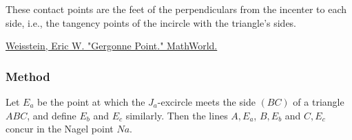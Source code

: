\medskip

These contact points are the feet of the perpendiculars from the incenter to each side, i.e., the tangency points of the incircle with the triangle’s sides.
\begin{flushright}
\small
\href{https://mathworld.wolfram.com/GergonnePoint.html}{Weisstein, Eric W. "Gergonne Point." MathWorld.}
\end{flushright}

\vspace{1em}

\begin{minipage}{.5\textwidth}
\begin{center}
\end{center}
\end{minipage}
\begin{minipage}{.5\textwidth}
\begin{tkzexample}
\end{tkzexample}
\end{minipage}

\subsubsection{Method } %
\label{ssub:method_triangle_nagel__point}

Let $E_a$ be the point at which the $J_a$-excircle meets the side $(BC)$ of a triangle $ABC$, and define $E_b$ and $E_c$ similarly. Then the lines $A,E_a$, $B,E_b$ and $C,E_c$ concur in the Nagel point  $Na$.

